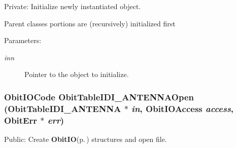 Private: Initialize newly instantiated object. 

Parent classes portions are (recursively) initialized first \begin{Desc}
\item[Parameters:]
\begin{description}
\item[{\em inn}]Pointer to the object to initialize. \end{description}
\end{Desc}
\subsubsection{\setlength{\rightskip}{0pt plus 5cm}Obit\-IOCode Obit\-Table\-IDI\_\-ANTENNAOpen ({\bf Obit\-Table\-IDI\_\-ANTENNA} $\ast$ {\em in}, Obit\-IOAccess {\em access}, {\bf Obit\-Err} $\ast$ {\em err})}\label{ObitTableIDI__ANTENNA_8c_a21}


Public: Create {\bf Obit\-IO}{\rm (p.\,\pageref{structObitIO})} structures and open file. 

